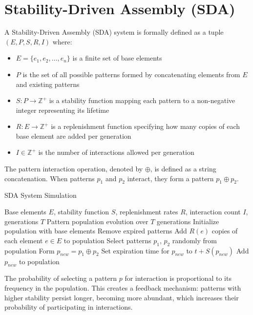 \documentclass[life,article,submit,pdftex,moreauthors]{Definitions/mdpi}
\begin{document}
\section{Stability-Driven Assembly (SDA)}

A Stability-Driven Assembly (SDA) \cite{adler_sda} system is formally defined as a tuple $(E, P, S, R, I)$ where:
\begin{itemize}
   \item $E = \{e_1, e_2, \ldots, e_n\}$ is a finite set of base elements
   \item $P$ is the set of all possible patterns formed by concatenating elements from $E$ and existing patterns
   \item $S: P \rightarrow \mathbb{Z}^{+}$ is a stability function mapping each pattern to a non-negative integer representing its lifetime
   \item $R: E \rightarrow \mathbb{Z}^{+}$ is a replenishment function specifying how many copies of each base element are added per generation
   \item $I \in \mathbb{Z}^{+}$ is the number of interactions allowed per generation
\end{itemize}

The pattern interaction operation, denoted by $\oplus$, is defined as a string concatenation. When patterns $p_1$ and $p_2$ interact, they form a pattern $p_1 \oplus p_2$.

\begin{algorithm}[H]
\caption{SDA System Simulation}
\footnotesize
\begin{algorithmic}[1]
\REQUIRE Base elements $E$, stability function $S$, replenishment rates $R$, interaction count $I$, generations $T$
\ENSURE Pattern population evolution over $T$ generations
\STATE Initialize population with base elements
   \STATE Remove expired patterns
   \STATE Add $R(e)$ copies of each element $e \in E$ to population
       \STATE Select patterns $p_1$, $p_2$ randomly from population
       \STATE Form $p_{new} = p_1 \oplus p_2$
       \STATE Set expiration time for $p_{new}$ to $t + S(p_{new})$
       \STATE Add $p_{new}$ to population
   \ENDFOR
\ENDFOR
\end{algorithmic}
\end{algorithm}


The probability of selecting a pattern $p$ for interaction is proportional to its frequency in the population. This creates a feedback mechanism: patterns with higher stability persist longer, becoming more abundant, which increases their probability of participating in interactions.
\end{document}
